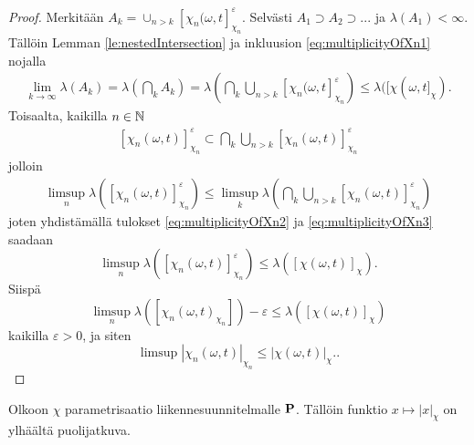 \documentclass[12pt,oneside,a4paper]{amsbook} %
\begin{document}
\begin{proof}
        
    Merkitään $A_k = \cup_{n > k}[\chi_n(\omega, t]_{\chi_n}^\varepsilon$. Selvästi $A_1 \supset A_2 \supset ...$ ja $\lambda(A_1) < \infty$. Tällöin Lemman \ref{le:nestedIntersection} ja inkluusion \eqref{eq:multiplicityOfXn1} nojalla
    \begin{align*}
        \lim_{k\to \infty} \lambda(A_k) = \lambda\left(\bigcap_k A_k\right) = \lambda\left(\bigcap_k \bigcup_{n > k}[\chi_n(\omega, t]_{\chi_n}^\varepsilon\right) \le \lambda([\chi(\omega, t]_\chi).
    \end{align*}
    Toisaalta, kaikilla $n \in \N$
    \begin{align}\label{eq:multiplicityOfXn2}
        [\chi_n(\omega, t)]_{\chi_n}^\varepsilon \subset \bigcap_k \bigcup_{n > k} [\chi_n(\omega, t)]_{\chi_n}^\varepsilon
    \end{align}
    jolloin
    \begin{align}\label{eq:multiplicityOfXn3}
        \limsup_n \lambda\left([\chi_n(\omega, t)]_{\chi_n}^\varepsilon\right) \le \limsup_k \lambda\left(\bigcap_k \bigcup_{n > k} [\chi_n(\omega, t)]_{\chi_n}^\varepsilon\right)
    \end{align}
    joten yhdistämällä tulokset \eqref{eq:multiplicityOfXn2} ja \eqref{eq:multiplicityOfXn3} saadaan
    \begin{equation*}
        \limsup_n \lambda([\chi_n(\omega, t)]_{\chi_n}^\varepsilon) \le \lambda([\chi(\omega, t)]_\chi).
    \end{equation*}
    Siispä
    \begin{equation*}
        \limsup_n \lambda([\chi_n(\omega, t)_{\chi_n}]) - \varepsilon \le \lambda([\chi(\omega, t)]_\chi)
    \end{equation*}
    kaikilla $\varepsilon > 0$, ja siten
    \begin{equation*}
        \limsup |\chi_n(\omega, t)|_{\chi_n} \le |\chi(\omega, t)|_\chi..
    \end{equation*}
\end{proof}
\begin{lemma}\label{le:multiplicityUSC}
    Olkoon $\chi$ parametrisaatio liikennesuunnitelmalle $\P$. Tällöin funktio $x \mapsto |x|_\chi$ on ylhäältä puolijatkuva.
\end{lemma}
\end{document}
